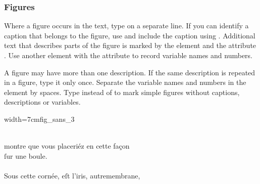 \subsubsection{Figures}
\label{section figures}

\begin{mainrule}
Where a figure occurs in the text, type  on a separate line. If you can identify a caption that belongs to the figure, use  and include the caption using . Additional text that describes parts of the figure is marked by the  element and the attribute . Use another  element with the attribute  to record variable names and numbers.
\end{mainrule}

\begin{clarification}
A figure may have more than one description.
If the same description is repeated in a figure, type it only once.
Separate the variable names and numbers in the  element by spaces.
Type  instead of  to mark simple figures without captions, descriptions or variables.
\end{clarification}



\vspace{2mm}
\begin{sampleImageSmall}{width=7cm}{fig_sans_3}
\begin{typeLatin}
 \someText \\
montre que vous placeriéz en cette façon  \\
ſur une boule. \\
 \\
Sous cette cornée, eſt l'iris, autre\lwr membrane,  \\
\someText {}
\end{typeLatin}
\end{sampleImageSmall}

